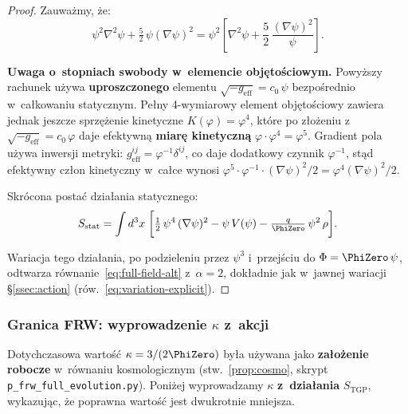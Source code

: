 \begin{proof}
Zauwa\.zmy, \.ze:
\[
  \psi^2\nabla^2\psi + \tfrac{5}{2}\,\psi(\nabla\psi)^2
  = \psi^2\!\left[\nabla^2\psi + \frac{5}{2}\,\frac{(\nabla\psi)^2}{\psi}\right].
\]

\textbf{Uwaga o~stopniach swobody w~elemencie obj\k{e}to\'sciowym.}
Powy\.zszy rachunek u\.zywa \textbf{uproszczonego} elementu
$\sqrt{-g_{\mathrm{eff}}} = c_0\,\psi$ bezpo\'srednio
w~ca\l{}kowaniu statycznym. Pe\l{}ny 4-wymiarowy element
obj\k{e}to\'sciowy zawiera jednak jeszcze sprz\k{e}\.zenie
kinetyczne $K(\varphi) = \varphi^4$, kt\'ore po z\l{}o\.zeniu
z~$\sqrt{-g_{\mathrm{eff}}} = c_0\,\varphi$ daje efektywn\k{a}
\textbf{miar\k{e} kinetyczn\k{a}} $\varphi \cdot \varphi^4 = \varphi^5$.
Gradient pola u\.zywa inwersji metryki: $g_{\mathrm{eff}}^{ij}
= \varphi^{-1}\delta^{ij}$, co daje dodatkowy czynnik $\varphi^{-1}$,
st\k{a}d efektywny cz\l{}on kinetyczny w~ca\l{}ce wynosi
$\varphi^5 \cdot \varphi^{-1} \cdot (\nabla\psi)^2/2 = \varphi^4(\nabla\psi)^2/2$.

Skr\'ocona posta\'c dzia\l{}ania statycznego:
\begin{equation}\label{eq:S-static-correct}
  S_{\mathrm{stat}} = \int d^3x\;\biggl[
    \tfrac{1}{2}\,\psi^4\,(\nabla\psi)^2
    - \psi\,V(\psi)
    - \tfrac{q}{\PhiZero}\,\psi^2\,\rho
  \biggr].
\end{equation}

Wariacja tego dzia\l{}ania, po podzieleniu przez $\psi^3$
i~przej\'sciu do $\Phi = \PhiZero\,\psi$, odtwarza
r\'ownanie~\eqref{eq:full-field-alt} z~$\alpha = 2$,
dok\l{}adnie jak w~jawnej wariacji \S\ref{ssec:action}
(r\'ow.~\eqref{eq:variation-explicit}).
\end{proof}

\subsubsection{Granica FRW: wyprowadzenie $\kappa$ z~akcji}%
\label{sssec:kappa-derivation}\label{ssec:kappa-obs}

Dotychczasowa warto\'s\'c $\kappa = 3/(2\PhiZero)$ by\l{}a
u\.zywana jako \textbf{za\l{}o\.zenie robocze} w~r\'ownaniu
kosmologicznym (stw.~\ref{prop:cosmo},
skrypt \texttt{p\_frw\_full\_evolution.py}).
Poni\.zej wyprowadzamy $\kappa$ \textbf{z~dzia\l{}ania}
$S_{\mathrm{TGP}}$, wykazuj\k{a}c, \.ze poprawna warto\'s\'c
jest dwukrotnie mniejsza.

